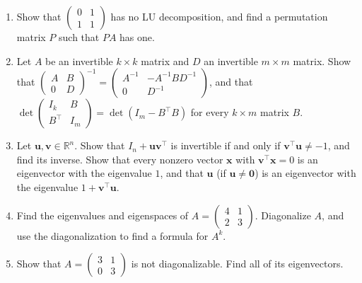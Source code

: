 \begin{enumerate}[leftmargin=*]
	\begin{enumerate}
		\item Find the LU decomposition of $A$, and use it to compute $\det(A)$ and to solve $A\mathbf{x} = (2, 8, 10)^\top$.
		\item Let $D$ be the diagonal matrix with the diagonal entries of $U$. Check that $U = DL^\top$, so that $A = LDL^\top$. Show that every invertible symmetric matrix that has an LU decomposition can be written as $A = LDL^\top$ in this way. (Hint: uniqueness.)
	\end{enumerate}
	\item Show that $\begin{pmatrix} 0 & 1 \\ 1 & 1 \end{pmatrix}$ has no LU decomposition, and find a permutation matrix $P$ such that $PA$ has one.
	\item \homework{} Let $A$ be an invertible $k \times k$ matrix and $D$ an invertible $m \times m$ matrix. Show that $\begin{pmatrix} A & B \\ 0 & D \end{pmatrix}^{-1} = \begin{pmatrix} A^{-1} & -A^{-1}BD^{-1} \\ 0 & D^{-1} \end{pmatrix}$, and that $\det\begin{pmatrix} I_k & B \\ B^\top & I_m \end{pmatrix} = \det(I_m - B^\top B)$ for every $k \times m$ matrix $B$.
	\item \homework{} Let $\mathbf{u}, \mathbf{v} \in \mathbb{R}^n$. Show that $I_n + \mathbf{u}\mathbf{v}^\top$ is invertible if and only if $\mathbf{v}^\top \mathbf{u} \neq -1$, and find its inverse. Show that every nonzero vector $\mathbf{x}$ with $\mathbf{v}^\top \mathbf{x} = 0$ is an eigenvector with the eigenvalue $1$, and that $\mathbf{u}$ (if $\mathbf{u} \neq \mathbf{0}$) is an eigenvector with the eigenvalue $1 + \mathbf{v}^\top \mathbf{u}$.
	\item \homework{} Find the eigenvalues and eigenspaces of $A = \begin{pmatrix} 4 & 1 \\ 2 & 3 \end{pmatrix}$. Diagonalize $A$, and use the diagonalization to find a formula for $A^k$.
	\item Show that $A = \begin{pmatrix} 3 & 1 \\ 0 & 3 \end{pmatrix}$ is not diagonalizable. Find all of its eigenvectors.

\end{enumerate}
